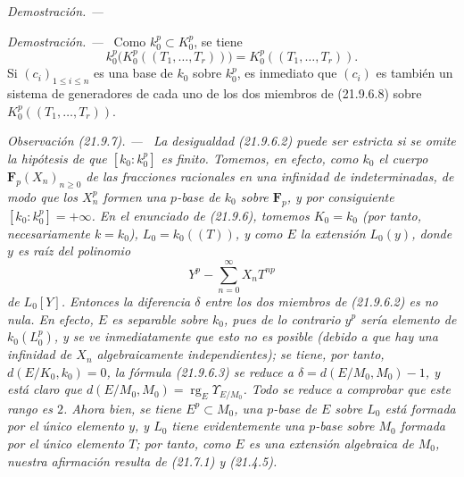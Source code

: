 \documentclass[10pt,oneside]{book}
\makeatletter
\newcommand{\setmanualcurrentlabel}[1]{\def\@currentlabel{#1}}
\newenvironment{remark}[1][]{%
  \setmanualcurrentlabel{#1}\par\medskip\noindent\itshape Observación (#1). ---\ }{\par}
\newenvironment{proof}{%
  \par\medskip\noindent\textit{Demostración. ---\ }}{\par}
\makeatother
\begin{document}
\begin{proof}
\begin{enumerate}
  \begin{proof}
  Como $k_0^p\subset K_0^p$, se tiene
  \[
    k_0^p\bigl(K_0^p((T_1,\ldots,T_r))\bigr)
    =K_0^p((T_1,\ldots,T_r)).
  \]
  Si $(c_i)_{1\leqslant i\leqslant n}$ es una base de $k_0$ sobre $k_0^p$,
  es inmediato que $(c_i)$ es también un sistema de generadores de cada uno
  de los dos miembros de (21.9.6.8) sobre
  $K_0^p((T_1,\ldots,T_r))$.
  \end{proof}
\end{enumerate}
\end{proof}

\begin{remark}[21.9.7]
\label{0.21.9.7-es}
La desigualdad (21.9.6.2) puede ser estricta si se omite la hipótesis de que
$[k_0:k_0^p]$ es finito. Tomemos, en efecto, como $k_0$ el cuerpo
$\mathbf F_p(X_n)_{n\geqslant0}$ de las fracciones racionales en una infinidad
de indeterminadas, de modo que los $X_n^p$ formen una $p$-base de $k_0$ sobre
$\mathbf F_p$, y por consiguiente $[k_0:k_0^p]=+\infty$. En el enunciado de
(21.9.6), tomemos $K_0=k_0$ (por tanto, necesariamente $k=k_0$),
$L_0=k_0((T))$, y como $E$ la extensión $L_0(y)$, donde $y$ es raíz del
polinomio
\[
  Y^p-\sum_{n=0}^{\infty}X_nT^{np}
\]
de $L_0[Y]$. Entonces la diferencia $\delta$ entre los dos miembros de
(21.9.6.2) es \emph{no nula}. En efecto, $E$ es \emph{separable} sobre $k_0$,
pues de lo contrario $y^p$ sería elemento de $k_0(L_0^p)$, y se ve
inmediatamente que esto no es posible (debido a que hay una infinidad de
$X_n$ algebraicamente independientes); se tiene, por tanto,
$d(E/K_0,k_0)=0$, la fórmula (21.9.6.3) se reduce a
$\delta=d(E/M_0,M_0)-1$, y está claro que
$d(E/M_0,M_0)=\operatorname{rg}_E\Upsilon_{E/M_0}$. Todo se reduce a comprobar
que este rango es $2$. Ahora bien, se tiene $E^p\subset M_0$, una $p$-base de
$E$ sobre $L_0$ está formada por el único elemento $y$, y $L_0$ tiene
evidentemente una $p$-base sobre $M_0$ formada por el único elemento $T$; por
tanto, como $E$ es una extensión algebraica de $M_0$, nuestra afirmación
resulta de (21.7.1) y (21.4.5).
\end{remark}
\end{document}
